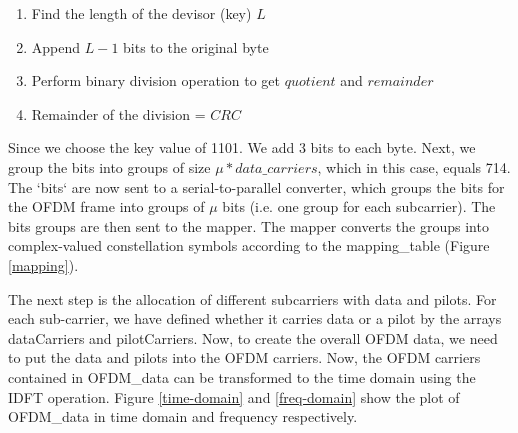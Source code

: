\begin{enumerate}
    \item Find the length of the devisor (key) $L$
    \item Append $L-1$ bits to the original byte
    \item Perform binary division operation to get $quotient$ and $remainder$
    \item Remainder of the division = $CRC$
\end{enumerate}

Since we choose the key value of 1101. We add 3 bits to each byte. Next, we group the bits into groups of size $\mu * data\_carriers$, which in this case, equals 714. The `bits` are now sent to a serial-to-parallel converter, which groups the bits for the OFDM frame into groups of $\mu$ bits (i.e. one group for each subcarrier). The bits groups are then sent to the mapper. The mapper converts the groups into complex-valued constellation symbols according to the mapping\_table (Figure \ref{mapping}).

The next step is the allocation of different subcarriers with data and pilots. For each sub-carrier, we have defined whether it carries data or a pilot by the arrays dataCarriers and pilotCarriers. Now, to create the overall OFDM data, we need to put the data and pilots into the OFDM carriers. Now, the OFDM carriers contained in OFDM\_data can be transformed to the time domain using the IDFT operation. Figure \ref{time-domain} and \ref{freq-domain} show the plot of OFDM\_data in time domain and frequency respectively.

